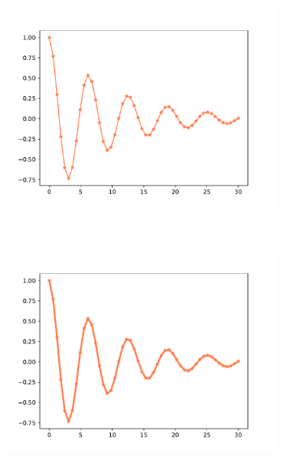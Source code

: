 \begin{figure}[h!]
\begin{subfigure}{0.48\textwidth}
\centering
\includegraphics[width=0.99\textwidth]{img/ch03/plot_color_and_style_03.pdf}
\label{fig:plot_color_and_style_03}
\end{subfigure}~
\begin{subfigure}{0.48\textwidth}
\centering
\includegraphics[width=0.99\textwidth]{img/ch03/plot_color_and_style_04.pdf}
\label{fig:plot_color_and_style_04}
\end{subfigure}

\caption{}
\end{figure}

